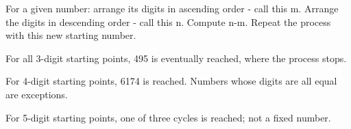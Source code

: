  For a given number: arrange its digits in ascending
order - call this m. Arrange the digits in descending order - 
call this n. Compute n-m. Repeat the process with this
new starting number.
\par
For all 3-digit starting points, 495 is eventually reached,
where the process stops.
\par
For 4-digit starting points, 6174 is reached. Numbers whose digits 
are all equal are exceptions.
\par
For 5-digit starting points, one of three cycles is reached;
not a fixed number.
